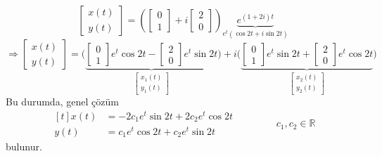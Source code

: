 \documentclass[11pt,a4paper]{article}
\begin{document}
\begin{cozum}
\[
\begin{bmatrix} x(t) \\ y(t) \end{bmatrix} = \left(\begin{bmatrix} 0 \\ 1 \end{bmatrix} + i\begin{bmatrix} 2 \\ 0 \end{bmatrix}\right)\underbrace{e^{(1+2i)t}}_{e^{t}(\cos 2t + i\sin 2t)}
\]
\[
\Rightarrow \begin{bmatrix} x(t) \\ y(t) \end{bmatrix} = \Biggl(\underbrace{\begin{bmatrix} 0 \\ 1 \end{bmatrix}e^{t}\cos 2t - \begin{bmatrix} 2 \\ 0 \end{bmatrix}e^{t}\sin 2t}_{\begin{bmatrix} x_1(t) \\ y_1(t) \end{bmatrix}}\Biggr) + i\Biggl(\underbrace{\begin{bmatrix} 0 \\ 1 \end{bmatrix}e^{t}\sin 2t + \begin{bmatrix} 2 \\ 0 \end{bmatrix}e^{t}\cos 2t}_{\begin{bmatrix} x_2(t) \\ y_2(t) \end{bmatrix}}\Biggr)
\]
Bu durumda, genel çözüm
\[
\begin{aligned}[t] x(t) &= -2c_1e^{t}\sin 2t + 2c_2e^{t}\cos 2t \\ y(t) &= c_1e^{t}\cos 2t + c_2e^{t}\sin 2t \end{aligned} \qquad\qquad c_1, c_2 \in \mathbb{R}
\]
bulunur.
\end{cozum}
\end{document}
